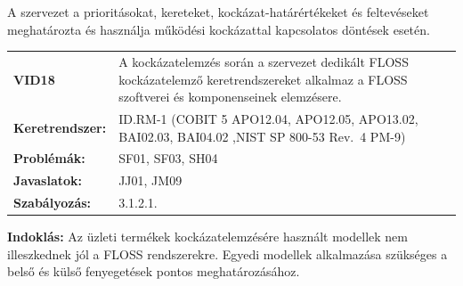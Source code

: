 \documentclass[12pt,magyar,a4paper,oneside]{scrreprt}
\begin{document}
A szervezet a prioritásokat, kereteket, kockázat-határértékeket és
feltevéseket meghatározta és használja működési kockázattal kapcsolatos
döntések esetén.

\begin{longtable}[]{@{}ll@{}}
\toprule
\endhead
\begin{minipage}[t]{0.16\columnwidth}\raggedright
\textbf{VID18}\strut
\end{minipage} & \begin{minipage}[t]{0.79\columnwidth}\raggedright
A kockázatelemzés során a szervezet dedikált FLOSS kockázatelemző
keretrendszereket alkalmaz a FLOSS szoftverei és komponenseinek
elemzésere.\strut
\end{minipage}\tabularnewline
\begin{minipage}[t]{0.16\columnwidth}\raggedright
\textbf{Keretrendszer:}\strut
\end{minipage} & \begin{minipage}[t]{0.79\columnwidth}\raggedright
ID.RM-1 (COBIT 5 APO12.04, APO12.05, APO13.02, BAI02.03, BAI04.02 ,NIST
SP 800-53 Rev.~4 PM-9)\strut
\end{minipage}\tabularnewline
\begin{minipage}[t]{0.16\columnwidth}\raggedright
\textbf{Problémák:}\strut
\end{minipage} & \begin{minipage}[t]{0.79\columnwidth}\raggedright
SF01, SF03, SH04\strut
\end{minipage}\tabularnewline
\begin{minipage}[t]{0.16\columnwidth}\raggedright
\textbf{Javaslatok:}\strut
\end{minipage} & \begin{minipage}[t]{0.79\columnwidth}\raggedright
JJ01, JM09\strut
\end{minipage}\tabularnewline
\begin{minipage}[t]{0.16\columnwidth}\raggedright
\textbf{Szabályozás:}\strut
\end{minipage} & \begin{minipage}[t]{0.79\columnwidth}\raggedright
3.1.2.1.\strut
\end{minipage}\tabularnewline
\bottomrule
\end{longtable}

\textbf{Indoklás: } Az üzleti termékek kockázatelemzésére használt
modellek nem illeszkednek jól a FLOSS rendszerekre. Egyedi modellek
alkalmazása szükséges a belső és külső fenyegetések pontos
meghatározásához.
\end{document}

